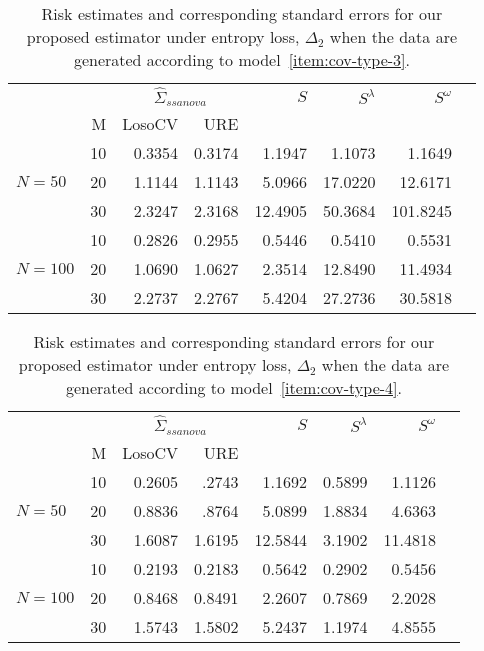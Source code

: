 \documentclass[12pt]{article}
\theoremstyle{definition}
\begin{document}

\begin{table}[H]
\centering
\caption{Risk estimates and corresponding standard errors for our proposed estimator under entropy loss, $\Delta_2$ when the data are generated according to model~\ref{item:cov-type-3}.} 
\begin{tabular}{l|r|rrrrrr}
&  & \multicolumn{2}{c}{$\hat{\Sigma}_{ssanova}$} & $S$ & $S^\lambda$ & $S^\omega$ \\ 
&M & \mbox{LosoCV} & \mbox{URE} &  \\  
&    10 & 0.3354 &	0.3174	&  1.1947  & 1.1073 & 1.1649\\ 
$N = 50$ &    20 & 1.1144 &	1.1143	&  5.0966&17.0220 & 12.6171 \\ 
  &    30 & 2.3247 & 	2.3168	&  12.4905 & 50.3684 & 101.8245\\ 
   \hdashline
    &    10 & 0.2826 & 0.2955  & 0.5446& 0.5410 & 0.5531  \\ 
  $N = 100$ &    20 & 1.0690 &  1.0627 & 2.3514 & 12.8490 & 11.4934\\ 
   &    30 & 2.2737 & 2.2767 & 5.4204& 27.2736 & 30.5818  \\ 
\end{tabular}
\end{table}

\begin{table}[H]
\centering
\caption{Risk estimates and corresponding standard errors for our proposed estimator under entropy loss, $\Delta_2$ when the data are generated according to model~\ref{item:cov-type-4}.} \begin{tabular}{l|r|rrrrrr}
&  & \multicolumn{2}{c}{$\hat{\Sigma}_{ssanova}$} & $S$ & $S^\lambda$ & $S^\omega$ \\ 
&M & \mbox{LosoCV} & \mbox{URE} &  \\ 
  \hline
&    10 & 0.2605 & .2743&  1.1692 & 0.5899 & 1.1126 \\ 
$N = 50$ &    20 & 0.8836 & .8764 & 5.0899 & 1.8834 & 4.6363 \\ 
   &    30 & 1.6087 & 1.6195 &12.5844&3.1902 & 11.4818 \\ \hdashline
 &    10 & 0.2193 & 0.2183 & 0.5642 & 0.2902 & 0.5456 \\ 
  $N = 100$ &    20 & 0.8468 & 0.8491 & 2.2607 & 0.7869 & 2.2028\\ 
   &    30 & 1.5743 & 1.5802 & 5.2437 & 1.1974 & 4.8555 \\
  \end{tabular}
\end{table}
\end{document}
